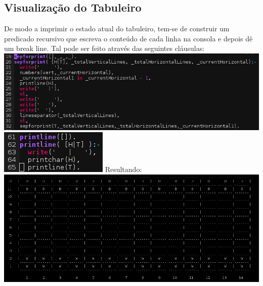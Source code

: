 \documentclass[a4paper]{article}
\begin{document}
\subsection{Visualização do Tabuleiro}
De modo a imprimir o estado atual do tabuleiro, tem-se de construir um predicado recursivo que escreva o conteúdo de cada linha na consola e depois dê um break line. Tal pode ser feito através das seguintes cláusulas:
\includegraphics[scale=0.60]{imprimir.png}
\\\linebreak
\includegraphics[scale=0.50]{imprimir1.png}
Resultando:
\\\linebreak
\includegraphics[scale=0.40]{tabuleiro.png}
\end{document}
